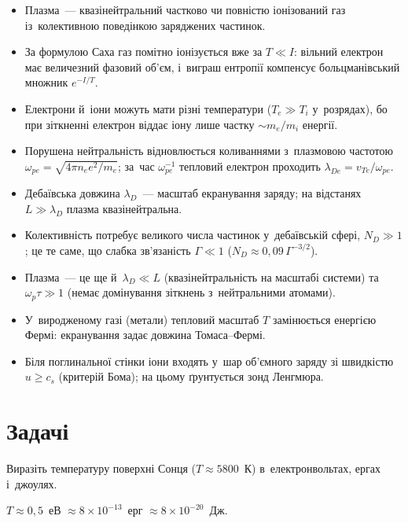 \begin{Summary}
\begin{itemize}
\item Плазма~--- квазінейтральний частково чи повністю іонізований газ із~колективною поведінкою заряджених частинок.
\item За формулою Саха газ помітно іонізується вже за $T\ll I$: вільний електрон має величезний фазовий об'єм, і~виграш ентропії компенсує больцманівський множник $e^{-I/T}$.
\item Електрони й~іони можуть мати різні температури ($T_e\gg T_i$ у~розрядах), бо при зіткненні електрон віддає іону лише частку $\sim m_e/m_i$ енергії.
\item Порушена нейтральність відновлюється коливаннями з~плазмовою частотою $\omega_{pe}=\sqrt{4\pi n_ee^2/m_e}$; за~час $\omega_{pe}^{-1}$ тепловий електрон проходить $\lambda_{De}=v_{Te}/\omega_{pe}$.
\item Дебаївська довжина $\lambda_D$~--- масштаб екранування заряду; на відстанях $L\gg\lambda_D$ плазма квазінейтральна.
\item Колективність потребує великого числа частинок у~дебаївській сфері, $N_D\gg1$; це те саме, що слабка зв'язаність $\Gamma\ll1$ ($N_D\approx0{,}09\,\Gamma^{-3/2}$).
\item Плазма~--- це ще й~$\lambda_D\ll L$ (квазінейтральність на масштабі системи) та~$\omega_p\tau\gg1$ (немає домінування зіткнень з~нейтральними атомами).
\item У~виродженому газі (метали) тепловий масштаб $T$ замінюється енергією Фермі: екранування задає довжина Томаса--Фермі.
\item Біля поглинальної стінки іони входять у~шар об'ємного заряду зі швидкістю $u\ge c_s$ (критерій Бома); на цьому ґрунтується зонд Ленгмюра.
\end{itemize}
\end{Summary}

\section*{Задачі}

\begin{problem}\label{prb:SunTemperature}
	Виразіть температуру поверхні Сонця ($T\approx5800$~К) в~електронвольтах, ергах і~джоулях.
	\begin{solution}
		$T\approx0{,}5$~еВ $\approx8\times10^{-13}$~ерг $\approx8\times10^{-20}$~Дж.
	\end{solution}
\end{problem}

